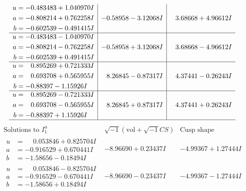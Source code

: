 \documentclass[1p]{elsarticle_modified}
\theoremstyle{definition}
\newcommand{\I}{\sqrt{-1}}
\begin{document}
$$\begin{array}{c|c|c}
\begin{aligned}
u &= -0.483483 + 1.040970 I \\
a &= -0.808214 + 0.762258 I \\
b &= -0.602539 - 0.491415 I\end{aligned}
 & -0.58958 - 3.12068 I & \phantom{-}3.68668 + 4.96612 I \\ \hline\begin{aligned}
u &= -0.483483 - 1.040970 I \\
a &= -0.808214 - 0.762258 I \\
b &= -0.602539 + 0.491415 I\end{aligned}
 & -0.58958 + 3.12068 I & \phantom{-}3.68668 - 4.96612 I \\ \hline\begin{aligned}
u &= \phantom{-}0.895269 + 0.721333 I \\
a &= \phantom{-}0.693708 + 0.565955 I \\
b &= -0.88397 - 1.15926 I\end{aligned}
 & \phantom{-}8.26845 - 0.87317 I & \phantom{-}4.37441 - 0.26243 I \\ \hline\begin{aligned}
u &= \phantom{-}0.895269 - 0.721333 I \\
a &= \phantom{-}0.693708 - 0.565955 I \\
b &= -0.88397 + 1.15926 I\end{aligned}
 & \phantom{-}8.26845 + 0.87317 I & \phantom{-}4.37441 + 0.26243 I\\
 \hline 
 \end{array}$$\newpage$$\begin{array}{c|c|c}  
\text{Solutions to }I^u_{1}& \I (\text{vol} + \sqrt{-1}CS) & \text{Cusp shape}\\
 \hline 
\begin{aligned}
u &= \phantom{-}0.053846 + 0.825704 I \\
a &= -0.916529 + 0.670441 I \\
b &= -1.58656 - 0.18494 I\end{aligned}
 & -8.96690 + 0.23437 I & -4.99367 + 1.27444 I \\ \hline\begin{aligned}
u &= \phantom{-}0.053846 - 0.825704 I \\
a &= -0.916529 - 0.670441 I \\
b &= -1.58656 + 0.18494 I\end{aligned}
 & -8.96690 - 0.23437 I & -4.99367 - 1.27444 I \\ \hline\begin{aligned}

\end{aligned}
\end{array}$$
\end{document}
